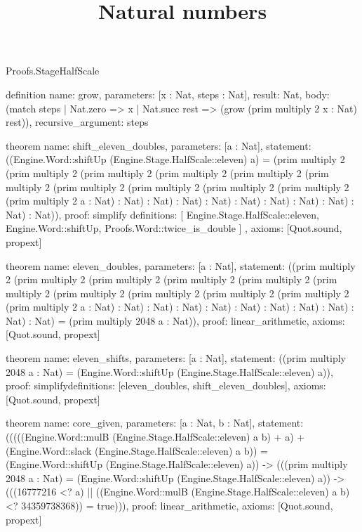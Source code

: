 \begin{lexlean}{Proofs.StageHalfScale}
\title{Natural numbers}
\begin{semanticmodule}
definition{
  name: grow,
  parameters: [x : Nat, steps : Nat],
  result: Nat,
  body: (match steps | Nat.zero => x | Nat.succ rest => (grow (prim multiply 2 x : Nat) rest)),
  recursive_argument: steps
}

theorem{
  name: shift_eleven_doubles,
  parameters: [a : Nat],
  statement: ((Engine.Word::shiftUp (Engine.Stage.HalfScale::eleven) a) = (prim multiply 2 (prim multiply 2 (prim multiply 2 (prim multiply 2 (prim multiply 2 (prim multiply 2 (prim multiply 2 (prim multiply 2 (prim multiply 2 (prim multiply 2 (prim multiply 2 a : Nat) : Nat) : Nat) : Nat) : Nat) : Nat) : Nat) : Nat) : Nat) : Nat) : Nat)),
  proof: simplify{
    definitions: [
      Engine.Stage.HalfScale::eleven,
      Engine.Word::shiftUp,
      Proofs.Word::twice_is_double
    ]
  },
  axioms: [Quot.sound, propext]
}

theorem{
  name: eleven_doubles,
  parameters: [a : Nat],
  statement: ((prim multiply 2 (prim multiply 2 (prim multiply 2 (prim multiply 2 (prim multiply 2 (prim multiply 2 (prim multiply 2 (prim multiply 2 (prim multiply 2 (prim multiply 2 (prim multiply 2 a : Nat) : Nat) : Nat) : Nat) : Nat) : Nat) : Nat) : Nat) : Nat) : Nat) : Nat) = (prim multiply 2048 a : Nat)),
  proof: linear_arithmetic{},
  axioms: [Quot.sound, propext]
}

theorem{
  name: eleven_shifts,
  parameters: [a : Nat],
  statement: ((prim multiply 2048 a : Nat) = (Engine.Word::shiftUp (Engine.Stage.HalfScale::eleven) a)),
  proof: simplify{definitions: [eleven_doubles, shift_eleven_doubles]},
  axioms: [Quot.sound, propext]
}

theorem{
  name: core_given,
  parameters: [a : Nat, b : Nat],
  statement: (((((Engine.Word::mulB (Engine.Stage.HalfScale::eleven) a b) + a) + (Engine.Word::slack (Engine.Stage.HalfScale::eleven) a b)) = (Engine.Word::shiftUp (Engine.Stage.HalfScale::eleven) a)) -> (((prim multiply 2048 a : Nat) = (Engine.Word::shiftUp (Engine.Stage.HalfScale::eleven) a)) -> (((16777216 <? a) || ((Engine.Word::mulB (Engine.Stage.HalfScale::eleven) a b) <? 34359738368)) = true))),
  proof: linear_arithmetic{},
  axioms: [Quot.sound, propext]
}


\end{semanticmodule}
\end{lexlean}
